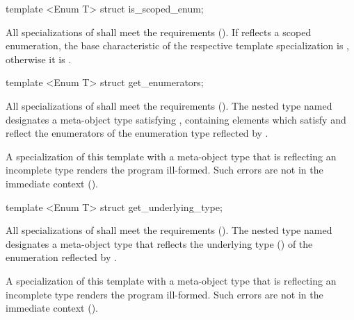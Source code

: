 \begin{std.txt}\color{addclr}

\begin{itemdecl}
template <Enum T> struct is_scoped_enum;
\end{itemdecl}

\begin{itemdescr}
\pnum
All specializations of  shall meet the  requirements (). If  reflects a scoped enumeration, the base characteristic of the respective template specialization is , otherwise it is .

\end{itemdescr}

\begin{itemdecl}
template <Enum T> struct get_enumerators;
\end{itemdecl}

\begin{itemdescr}
\pnum
All specializations of  shall meet the  requirements (). The nested type named  designates a meta-object type satisfying , containing elements which satisfy  and reflect the enumerators of the enumeration type reflected by .

\pnum
\remarks
A specialization of this template with a meta-object type that is reflecting an incomplete type renders the program ill-formed.
      Such errors are not in the immediate context ().
\end{itemdescr}

\begin{itemdecl}
template <Enum T> struct get_underlying_type;
\end{itemdecl}

\begin{itemdescr}
\pnum
All specializations of  shall meet the
 requirements (). The nested type named
 designates a meta-object type that reflects the underlying type
() of the enumeration reflected by .

\pnum
\remarks
A specialization of this template with a meta-object type that is reflecting an incomplete type renders the program ill-formed.
      Such errors are not in the immediate context ().
\end{itemdescr}
\end{std.txt}


